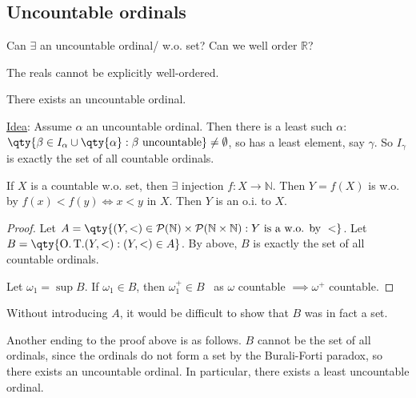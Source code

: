 \subsection{Uncountable ordinals}
\begin{question}
    Can $\exists$ an uncountable ordinal/ w.o. set?
    Can we well order $\mathbb{R}$?
\end{question}

\begin{answer}
    The reals cannot be explicitly well-ordered.
\end{answer}

\begin{theorem} \label{thm:12}
    There exists an uncountable ordinal.
\end{theorem}

\underline{Idea}: Assume $\alpha$ an uncountable ordinal.
Then there is a least such $\alpha$: \\
$\qty{\beta \in I_\alpha \cup \qty{\alpha} : \beta \text{ uncountable}} \neq \emptyset$, so has a least element, say $\gamma$.
So $I_\gamma$ is exactly the set of all countable ordinals.

If $X$ is a countable w.o. set, then $\exists$ injection $f : X \to \mathbb{N}$.
Then $Y = f(X)$ is w.o. by $f(x) < f(y) \iff x < y$ in $X$.
Then $Y$ is an o.i. to $X$.

\begin{proof}
    Let $A = \qty{(Y, <) \in \mathcal{P}(\mathbb{N}) \times \mathcal{P}(\mathbb{N} \times \mathbb{N}) : Y \text{ is a w.o. by } <}$.
    Let $B = \qty{\operatorname{O.T.}(Y, <) : (Y, <) \in A}$.
    By above, $B$ is exactly the set of all countable ordinals.

    Let $\omega_1 = \sup B$.
    If $\omega_1 \in B$, then $\omega_1^+ \in B$ \Lightning \ as $\omega$ countable $\implies \omega^+$ countable.
\end{proof}

\begin{remark}
    Without introducing $A$, it would be difficult to show that $B$ was in fact a set.
\end{remark}

\begin{remark}
    Another ending to the proof above is as follows.
    $B$ cannot be the set of all ordinals, since the ordinals do not form a set by the Burali-Forti paradox, so there exists an uncountable ordinal.
    In particular, there exists a least uncountable ordinal.
\end{remark}

